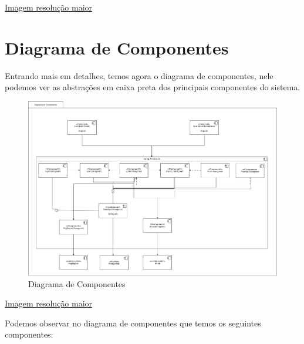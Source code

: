   \href{https://github.com/soltein/TCC/blob/main/Diagramas/out/diagrama_container/diagrama_container.png}{Imagem resolução maior}

  \section{Diagrama de Componentes}
  Entrando mais em detalhes, temos agora o diagrama de componentes, nele podemos ver as abstrações em caixa preta dos principais componentes
  do sistema.
  
  \begin{figure}[h]
    \centering
    \includegraphics[width=1\textwidth]{diagrama_componentes.png}
    \caption{Diagrama de Componentes}
    \label{fig:Diagrama de Componentes}
  \end{figure}

  \href{https://github.com/soltein/TCC/blob/main/Diagramas/out/diagrama_componentes.png}{Imagem resolução maior}

  Podemos observar no diagrama de componentes que temos os seguintes componentes:

